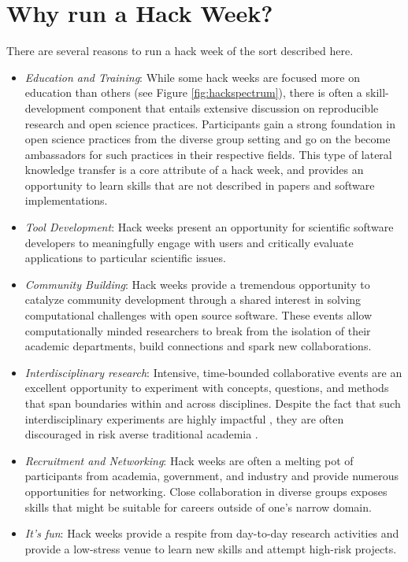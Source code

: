 \section*{Why run a Hack Week?}

There are several reasons to run a hack week of the sort described here.

\begin{itemize}
\item{\textit{Education and Training}: 
While some hack weeks are focused more on education than others (see Figure \ref{fig:hackspectrum}), there is often a skill-development component that entails extensive discussion on reproducible research and open science practices. Participants gain a strong foundation in open science practices from the diverse group setting and go on the become ambassadors for such practices in their respective fields. This type of lateral knowledge transfer is a core attribute of a hack week, and provides an opportunity to learn skills that are not described in papers and software implementations.}

\item{\textit{Tool Development}: Hack weeks present an opportunity for scientific software developers to meaningfully engage with users and critically evaluate applications to particular scientific issues.}

\item{\textit{Community Building}: Hack weeks provide a tremendous opportunity to catalyze community development through a shared interest in solving computational challenges with open source software. These events allow computationally minded researchers to break from the isolation of their academic departments, build connections and spark new collaborations.}


\item{\textit{Interdisciplinary research}: Intensive, time-bounded collaborative events are an excellent opportunity to experiment with concepts, questions, and methods that span boundaries within and across disciplines. Despite the fact that such interdisciplinary experiments are highly impactful \cite{Hall2012-hi}, they are often discouraged in risk averse traditional academia \cite{Sung2003-go, Rhoten2004-fk}}.

\item{\textit{Recruitment and Networking}: Hack weeks are often a melting pot of participants from academia, government, and industry and provide numerous opportunities for networking. Close collaboration in diverse groups exposes skills that might be suitable for careers outside of one's narrow domain.}

\item{\textit{It's fun}: Hack weeks provide a respite from day-to-day research activities and provide a low-stress venue to learn new skills and attempt high-risk projects.}

\end{itemize}


